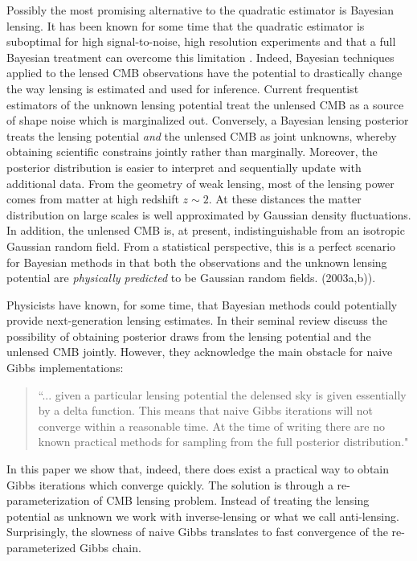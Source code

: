 \documentclass[iop,revtex4,apj,onecolumn]{emulateapj}
\begin{document}
 Possibly the most promising alternative to the quadratic estimator is Bayesian lensing. It has been known for some time that the quadratic estimator is suboptimal for high signal-to-noise, high resolution experiments and that a full Bayesian treatment can overcome this limitation
 \citep{HirataSeljak1, HirataSeljak2}. Indeed, Bayesian techniques applied to the lensed CMB observations have the potential to drastically change the way lensing is estimated and used for inference.  Current frequentist estimators of the unknown lensing potential treat the unlensed CMB as a source of shape noise which is marginalized out. Conversely, a Bayesian lensing posterior treats the lensing potential {\em and} the unlensed CMB as joint unknowns, whereby obtaining scientific constrains jointly rather than marginally. Moreover, the  posterior distribution is easier to interpret and sequentially update with additional data. From the geometry of weak lensing, most of the lensing power comes from matter at high redshift $z\sim 2$. At these distances the matter distribution on large scales is well approximated by Gaussian density fluctuations. In addition, the unlensed CMB is, at present, indistinguishable from an isotropic Gaussian random field.  From a statistical perspective, this is a perfect scenario for Bayesian methods in that both the observations and the unknown lensing potential are {\em physically predicted} to be Gaussian random fields.  (2003a,b)).
 
Physicists have known, for some time, that Bayesian methods could potentially provide next-generation lensing estimates. In their seminal review \cite{Lewis20061} discuss the possibility of obtaining posterior draws from the lensing potential and the unlensed CMB jointly. However, they acknowledge the main obstacle for naive Gibbs implementations:
\begin{quote}
``... given a particular lensing potential the delensed sky is given essentially by a delta function.
This means that naive Gibbs iterations will not converge within a reasonable time. At the time of writing there are no known practical methods for sampling from the full posterior distribution."
\end{quote}
In this paper we show that, indeed, there does exist a practical way to obtain Gibbs iterations which converge quickly. The solution is through a re-parameterization of CMB lensing problem. Instead of treating the lensing potential as unknown we work with inverse-lensing or what we call anti-lensing. Surprisingly, the slowness of naive Gibbs translates to fast convergence of the re-parameterized Gibbs chain. 
\end{document}
